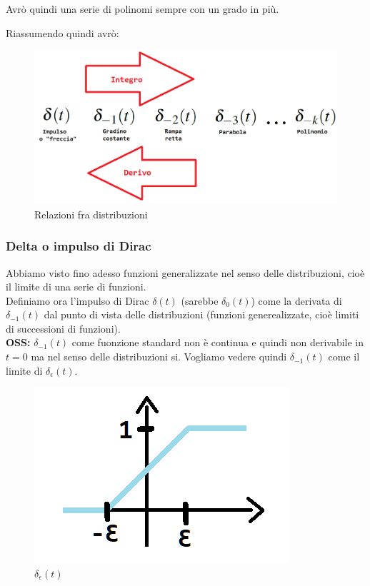 	Avrò quindi una serie di polinomi sempre con un grado in più.\\
	
\pagebreak

	Riassumendo quindi avrò:\\
	
	\begin{figure}[h]
		\centering
		\includegraphics[scale=0.5]{immagini/riassuntoDistribuzioni}
		\caption{ Relazioni fra distribuzioni }
		\label{fig: riassuntoDistribuzioni}
	\end{figure} 

\subsubsection{Delta o impulso di Dirac}
	
	Abbiamo visto fino adesso funzioni generalizzate nel senso delle distribuzioni, cioè il limite di una serie di funzioni.\\
	Definiamo ora l'impulso di Dirac $ \delta(t)$ (sarebbe $ \delta_0 (t)$) come la derivata di $ \delta_{-1} (t)$ dal punto di vista delle distribuzioni (funzioni generealizzate, cioè limiti di successioni di funzioni).\\
	
	\textbf{OSS:} $ \delta_{-1} (t)$ come fuonzione standard non è continua e quindi non derivabile in $ t=0 $ ma nel senso delle distribuzioni si. Vogliamo vedere quindi $ \delta_{-1} (t)$ come il limite di $ \delta_{ \epsilon} (t)$.\\
	
	\begin{figure}[h]
		\centering
		\includegraphics[scale=0.5]{immagini/deltaEpsilon}
		\caption{ $ \delta_{ \epsilon} (t)$ }
		\label{fig: deltaEpsilon}
	\end{figure}
	
